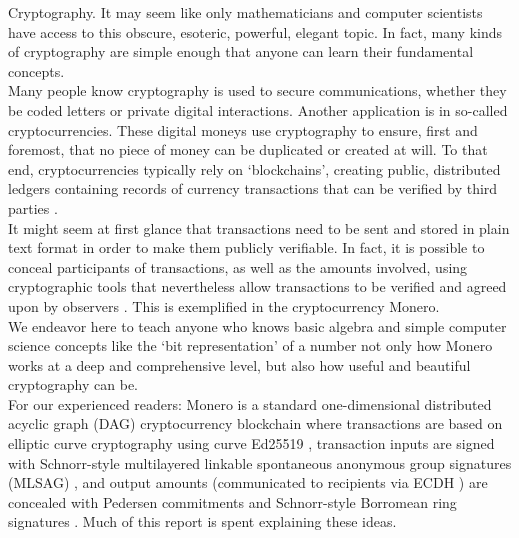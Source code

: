 

Cryptography. It may seem like only mathematicians and computer scientists have access to this obscure, esoteric, powerful, elegant topic. In fact, many kinds of cryptography are simple enough that anyone can learn their fundamental concepts.
\\ \newline
Many people know cryptography is used to secure communications, whether they be coded letters or private digital interactions. Another application is in so-called cryptocurrencies. These digital moneys use cryptography to ensure, first and foremost, that no piece of money can be duplicated or created at will. To that end, cryptocurrencies typically rely on `blockchains', creating public, distributed ledgers containing records of currency transactions that can be verified by third parties \cite{Nakamoto_bitcoin}.
\\ \newline
It might seem at first glance that transactions need to be sent and stored in plain text format in order to make them publicly verifiable. In fact, it is possible to conceal participants of transactions, as well as the amounts involved, using cryptographic tools that nevertheless allow transactions to be verified and agreed upon by observers \cite{cryptoNoteWhitePaper}. This is exemplified in the cryptocurrency Monero.
\\ \newline
We endeavor here to teach anyone who knows basic algebra and simple computer science concepts like the `bit representation' of a number not only how Monero works at a deep and comprehensive level, but also how useful and beautiful cryptography can be.
\\ \newline
For our experienced readers: Monero is a standard one-dimensional distributed acyclic graph (DAG) cryptocurrency blockchain \cite{Nakamoto_bitcoin} where transactions are based on elliptic curve cryptography using curve Ed25519 \cite{Bernstein2008}, transaction inputs are signed with Schnorr-style multilayered linkable spontaneous anonymous group signatures (MLSAG) \cite{MRL-0005}, and output amounts (communicated to recipients via ECDH \cite{Diffie-Hellman}) are concealed with Pedersen commitments \cite{maxwell-ct} and Schnorr-style Borromean ring signatures \cite{Signatures2015BorromeanRS}. Much of this report is spent explaining these ideas.